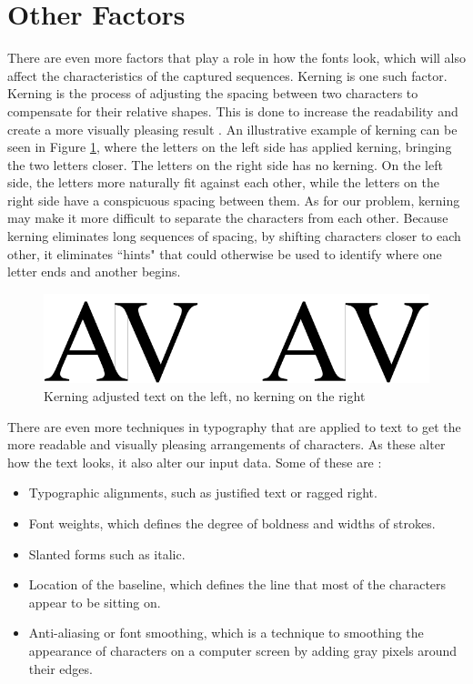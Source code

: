 
\section{Other Factors}
\label{sec:other_factors}
There are even more factors that play a role in how the fonts look, which will also affect the characteristics of the captured sequences. Kerning is one such factor. Kerning is the process of adjusting the spacing between two characters to compensate for their relative shapes. This is done to increase the readability and create a more visually pleasing result \citep{felici2011complete}. An illustrative example of kerning can be seen in Figure \ref{fig:kerning-comparison}, where the letters on the left side has applied kerning, bringing the two letters closer. The letters on the right side has no kerning. On the left side, the letters more naturally fit against each other, while the letters on the right side have a conspicuous spacing between them. As for our problem, kerning may make it more difficult to separate the characters from each other. Because kerning eliminates long sequences of spacing, by shifting characters closer to each other, it eliminates ``hints" that could otherwise be used to identify where one letter ends and another begins.

\begin{figure}[ht]
    \centering
    \includegraphics[width=1.0\textwidth]{fig/chapter2/kerning.png}
    \caption{Kerning adjusted text on the left, no kerning on the right}
    \label{fig:kerning-comparison}
\end{figure}

\newpage
There are even more techniques in typography that are applied to text to get the more readable and visually pleasing arrangements of characters. As these alter how the text looks, it also alter our input data. Some of these are \citep{felici2011complete}:

\begin{itemize}
    \item Typographic alignments, such as justified text or ragged right.
    \item Font weights, which defines the degree of boldness and widths of strokes.
    \item Slanted forms such as italic.
    \item Location of the baseline, which defines the line that most of the characters appear to be sitting on.
    \item Anti-aliasing or font smoothing, which is a technique to smoothing the appearance of characters on a computer screen by adding gray pixels around their edges.
\end{itemize}

